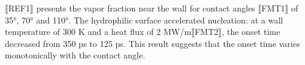 ⟦REF1⟧ presents the vapor fraction near the wall for contact angles ⟦FMT1⟧ of 35°, 70° and 110°. The hydrophilic surface accelerated nucleation: at a wall temperature of 300 K and a heat flux of 2 MW/m⟦FMT2⟧, the onset time decreased from 350 ps to 125 ps. This result suggests that the onset time varies monotonically with the contact angle.